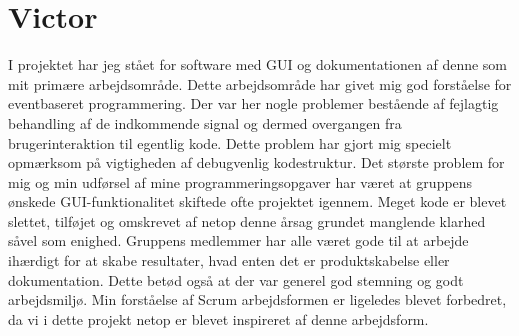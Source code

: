 \section{Victor}

I projektet har jeg stået for software med GUI og dokumentationen af denne som mit primære arbejdsområde. Dette arbejdsområde har givet mig god forståelse for eventbaseret programmering. Der var her nogle problemer bestående af fejlagtig behandling af de indkommende signal og dermed overgangen fra brugerinteraktion til egentlig kode. Dette problem har gjort mig specielt opmærksom på vigtigheden af debugvenlig kodestruktur. Det største problem for mig og min udførsel af mine programmeringsopgaver har været at gruppens ønskede GUI-funktionalitet skiftede ofte projektet igennem. Meget kode er blevet slettet, tilføjet og omskrevet af netop denne årsag grundet manglende klarhed såvel som enighed. Gruppens medlemmer har alle været gode til at arbejde ihærdigt for at skabe resultater, hvad enten det er produktskabelse eller dokumentation. Dette betød også at der var generel god stemning og godt arbejdsmiljø. Min forståelse af Scrum arbejdsformen er ligeledes blevet forbedret, da vi i dette projekt netop er blevet inspireret af denne arbejdsform.